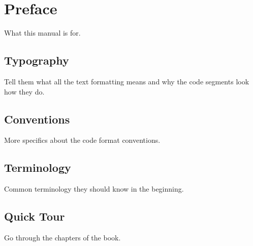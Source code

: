 \chapter*{Preface}

What this manual is for.

\section*{Typography}

Tell them what all the text formatting means and why the code segments look how they do.

\section*{Conventions}

More specifics about the code format conventions.

\section*{Terminology}

Common terminology they should know in the beginning.

\section*{Quick Tour}

Go through the chapters of the book.

